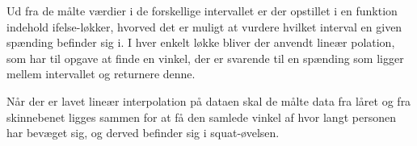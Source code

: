 Ud fra de målte værdier i de forskellige intervallet er der opstillet i en funktion indehold ifelse-løkker, hvorved det er muligt at vurdere hvilket interval en given spænding befinder sig i. I hver enkelt løkke bliver der anvendt lineær polation, som har til opgave at finde en vinkel, der er svarende til en spænding som ligger mellem intervallet og returnere denne. 

Når der er lavet lineær interpolation på dataen skal de målte data fra låret og fra skinnebenet ligges sammen for at få den samlede vinkel af hvor langt personen har bevæget sig, og derved befinder sig i squat-øvelsen. 



